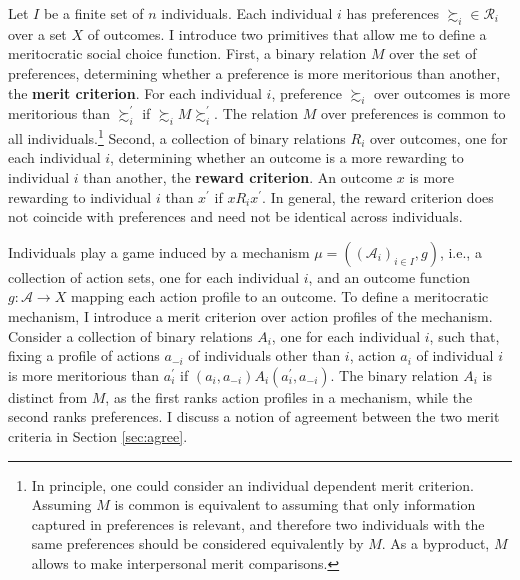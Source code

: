 Let \(I \) be a finite set of \( n \) individuals. Each individual \( i \) has preferences \( \succsim_i \in \mathcal{R}_i \) over a set \( X \) of outcomes. I introduce two primitives that allow me to define a meritocratic social choice function. First, a binary relation \( M \) over the set of preferences, determining whether a preference is more meritorious than another, the \textbf{merit criterion}. For each individual \( i \), preference \( \succsim_i \) over outcomes is more meritorious than \( \succsim_i^{\prime} \) if \( \succsim_i M \succsim_i^{\prime} \). The relation \( M \) over preferences is common to all individuals.\footnote{In principle, one could consider an individual dependent merit criterion. Assuming \( M \) is common is equivalent to assuming that only information captured in preferences is relevant, and therefore two individuals with the same preferences should be considered equivalently by \( M \). As a byproduct, \( M \) allows to make interpersonal merit comparisons.} Second, a collection of binary relations \( R_{i} \) over outcomes, one for each individual \( i \), determining whether an outcome is a more rewarding to individual \( i \) than another, the \textbf{reward criterion}. An outcome \( x \) is more rewarding to individual \( i \) than \( x^{\prime} \) if \( x R_{i} x^{\prime} \). In general, the reward criterion does not coincide with preferences and need not be identical across individuals.

Individuals play a game induced by a mechanism \( \mu = ( ( \mathcal{A}_i )_{i \in I}, g ) \), i.e., a collection of action sets, one for each individual \( i \), and an outcome function  \( g \colon \mathcal{A} \rightarrow X \) mapping each action profile to an outcome. To define a meritocratic mechanism, I introduce a merit criterion over action profiles of the mechanism. Consider a collection of binary relations \( A_i \), one for each individual \( i \), such that, fixing a profile of actions \( a_{-i} \) of individuals other than \( i \), action \( a_i \) of individual \( i \) is more meritorious than \( a_i^{\prime} \) if \( ( a_i, a_{-i} ) A_i ( a_i^{\prime}, a_{-i} ) \). The binary relation \( A_i \) is distinct from \( M \), as the first ranks action profiles in a mechanism, while the second ranks preferences. I discuss a notion of agreement between the two merit criteria in Section \ref{sec:agree}.

